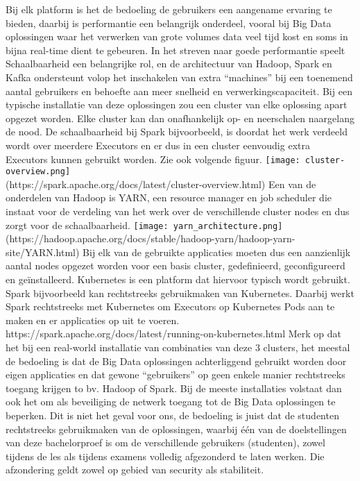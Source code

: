 Bij elk platform is het de bedoeling de gebruikers een aangename ervaring te bieden, daarbij is performantie een belangrijk onderdeel, vooral bij Big Data oplossingen waar het verwerken van grote volumes data veel tijd kost en soms in bijna real-time dient te gebeuren.
In het streven naar goede performantie speelt Schaalbaarheid een belangrijke rol, en de architectuur van Hadoop, Spark en Kafka ondersteunt volop het inschakelen van extra ``machines'' bij een toenemend aantal gebruikers en behoefte aan meer snelheid en verwerkingscapaciteit.
Bij een typische installatie van deze oplossingen zou een cluster van elke oplossing apart opgezet worden. Elke cluster kan dan onafhankelijk op- en neerschalen naargelang de nood.
\newline
De schaalbaarheid bij Spark bijvoorbeeld, is doordat het werk verdeeld wordt over meerdere Executors en er dus in een cluster eenvoudig extra Executors kunnen gebruikt worden. Zie ook volgende figuur.
\newline
\texttt{[image: cluster-overview.png]}
\\
(https://spark.apache.org/docs/latest/cluster-overview.html)
\newline
Een van de onderdelen van Hadoop is YARN, een resource manager en job scheduler die instaat voor de verdeling van het werk over de verschillende cluster nodes en dus zorgt voor de schaalbaarheid.
\newline
\texttt{[image: yarn\_architecture.png]}
\\
(https://hadoop.apache.org/docs/stable/hadoop-yarn/hadoop-yarn-site/YARN.html)
\newline
Bij elk van de gebruikte applicaties moeten dus een aanzienlijk aantal nodes opgezet worden voor een basis cluster, gedefinieerd, geconfigureerd en geïnstalleerd. Kubernetes is een platform dat hiervoor typisch wordt gebruikt. Spark bijvoorbeeld kan rechtstreeks gebruikmaken van Kubernetes. Daarbij werkt Spark rechtstreeks met Kubernetes om Executors op Kubernetes Pods aan te maken en er applicaties op uit te voeren.
\newline
https://spark.apache.org/docs/latest/running-on-kubernetes.html
\newline
\newline
Merk op dat het bij een real-world installatie van combinaties van deze 3 clusters, het meestal de bedoeling is dat de Big Data oplossingen achterliggend gebruikt worden door eigen applicaties en dat gewone ``gebruikers'' op geen enkele manier rechtstreeks toegang krijgen to bv. Hadoop of Spark. Bij de meeste installaties volstaat dan ook het om als beveiliging de netwerk toegang tot de Big Data oplossingen te beperken.
\newline
\newline
Dit is niet het geval voor ons, de bedoeling is juist dat de studenten rechtstreeks gebruikmaken van de oplossingen, waarbij één van de doelstellingen van deze bachelorproef is om de verschillende gebruikers (studenten), zowel tijdens de les als tijdens examens volledig afgezonderd te laten werken. Die afzondering geldt zowel op gebied van security als stabiliteit.

